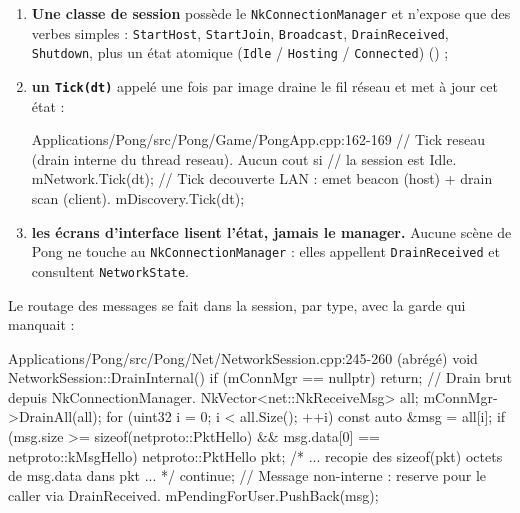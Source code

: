 \begin{enumerate}
  \item \textbf{Une classe de session} possède le \texttt{NkConnectionManager} et
        n'expose que des verbes simples :
        \texttt{StartHost}, \texttt{StartJoin}, \texttt{Broadcast},
        \texttt{DrainReceived}, \texttt{Shutdown}, plus un état atomique
        (\texttt{Idle} / \texttt{Hosting} / \texttt{Connected})
        () ;
  \item \textbf{un \texttt{Tick(dt)}} appelé une fois par image draine le fil
        réseau et met à jour cet état :

\begin{nkcode}{Applications/Pong/src/Pong/Game/PongApp.cpp:162-169}
            // Tick reseau (drain interne du thread reseau). Aucun cout si
            // la session est Idle.
            mNetwork.Tick(dt);
            // Tick decouverte LAN : emet beacon (host) + drain scan (client).
            mDiscovery.Tick(dt);
\end{nkcode}

  \item \textbf{les écrans d'interface lisent l'état, jamais le manager.} Aucune
        scène de Pong ne touche au \texttt{NkConnectionManager} : elles appellent
        \texttt{DrainReceived} et consultent \texttt{NetworkState}.
\end{enumerate}

Le routage des messages se fait dans la session, par type, avec la garde qui
manquait :

\begin{nkcode}{Applications/Pong/src/Pong/Net/NetworkSession.cpp:245-260 (abrégé)}
        void NetworkSession::DrainInternal() {
            if (mConnMgr == nullptr)
                return;
            // Drain brut depuis NkConnectionManager.
            NkVector<net::NkReceiveMsg> all;
            mConnMgr->DrainAll(all);
            for (uint32 i = 0; i < all.Size(); ++i) {
                const auto &msg = all[i];
                if (msg.size >= sizeof(netproto::PktHello) && msg.data[0] == netproto::kMsgHello) {
                    netproto::PktHello pkt;
                    /* ... recopie des sizeof(pkt) octets de msg.data dans pkt ... */
                    continue;
                }
                // Message non-interne : reserve pour le caller via DrainReceived.
                mPendingForUser.PushBack(msg);
            }
        }
\end{nkcode}

